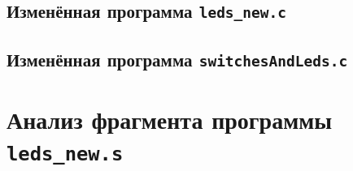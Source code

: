\documentclass[12pt]{extarticle}
\renewcommand{\baselinestretch}{1.5}
\begin{document}
\subsection{Изменённая программа \texttt{leds\_new.c}}
\renewcommand{\baselinestretch}{1}

\renewcommand{\baselinestretch}{1.5}

\subsection{Изменённая программа \texttt{switchesAndLeds.c}}
\renewcommand{\baselinestretch}{1}

\renewcommand{\baselinestretch}{1.5}

\section{Анализ фрагмента программы \texttt{leds\_new.s}}
\end{document}
